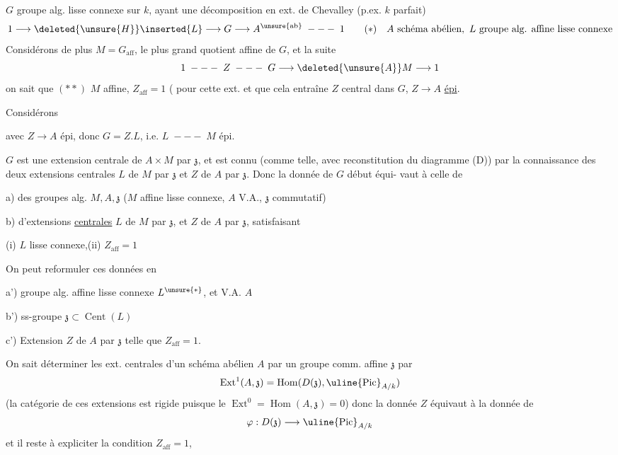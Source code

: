 $G$ groupe alg. lisse connexe sur $k$, ayant une décomposition en ext. de Chevalley
(p.ex. $k$ parfait)
\[
1\longrightarrow\deleted{\unsure{H}}\inserted{L}\longrightarrow G\longrightarrow A^{\unsure{\mathrm{ab}}}\;---\;1
\qquad (*)\quad A\text{ schéma abélien},\ L\text{ groupe alg. affine lisse connexe}
\]
Considérons de plus $M=G_{\mathrm{aff}}$, le plus grand quotient affine de $G$,
et la suite
\[1\;---\;Z\;---\;G\longrightarrow\deleted{\unsure{A}}M\longrightarrow1\]
on sait que $(**)$ $M$ affine, $Z_{\mathrm{aff}}=1$ ( pour cette ext.
et que cela entraîne $Z$ central dans $G$, $Z\longrightarrow A$ \uline{épi}.

Considérons

avec $Z\longrightarrow A$ épi, donc $G=Z.L$, i.e. $L\;---\;M$ épi.

$G$ est une extension centrale de $A\times M$ par $\mathfrak z$, et est connu (comme
telle, avec reconstitution du diagramme (D)) par la connaissance
des deux extensions centrales $L$ de $M$ par $\mathfrak z$ et $Z$ de $A$ par $\mathfrak z$.
Donc la donnée de $G$   début équi-
vaut à celle de

a) des groupes alg. $M,A,\mathfrak z$ ($M$ affine lisse connexe, $A$ V.A., $\mathfrak z$  commutatif)

b) d'extensions \uline{centrales} $L$ de $M$ par $\mathfrak z$, et $Z$ de $A$ par $\mathfrak z$, satisfaisant

(i) $L$ lisse connexe,\quad (ii) $Z_{\mathrm{aff}}=1$

On peut reformuler ces données en

a') groupe alg. affine lisse connexe $L^{\unsure{*}}$, et V.A. $A$

b') ss-groupe  $\mathfrak z\subset\operatorname{Cent}(L)$

c') Extension   $Z$ de $A$ par $\mathfrak z$ telle que $Z_{\mathrm{aff}}=1$.

On sait déterminer les ext. centrales d'un schéma abélien $A$
par un groupe  comm. affine $\mathfrak z$ par
\[
\operatorname{Ext}^1(A,\mathfrak z)=\operatorname{Hom}(D(\mathfrak z),\uline{\operatorname{Pic}}_{A/k})
\]
(la catégorie de ces extensions est rigide puisque le
$\operatorname{Ext}^0=\operatorname{Hom}(A,\mathfrak z)=0$) donc la donnée   $Z$ équivaut à
la donnée de
\[\varphi:D(\mathfrak z)\longrightarrow\uline{\operatorname{Pic}}_{A/k}\]
et il reste à expliciter la condition $Z_{\mathrm{aff}}=1$,  
